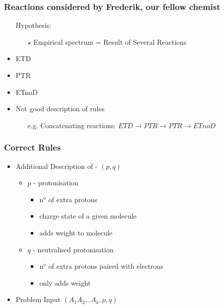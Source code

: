 \documentclass[xetex]{beamer}
\begin{document}
	\begin{frame}\frametitle{Reactions considered by Frederik, our fellow chemist}
		\begin{itemize}
			\item[] Hypothesis:
			\begin{itemize}
				\item[$\star$] Empirical spectrum = Result of Several Reactions
			\end{itemize}
			\item ETD
			\begin{center}
			\end{center}
			\item PTR
			\begin{center}
			\end{center}			
			\item ETnoD
			\begin{center}
			\end{center}			
			\item Not good description of rules
			\begin{itemize}
			 	\item[e.g.] Concatenating reactions: $ETD \rightarrow PTR \rightarrow PTR \rightarrow ETnoD$  
			\end{itemize} 			
		\end{itemize}
	\end{frame}

	\begin{frame}\frametitle{Correct Rules}
		
		\begin{itemize}
			\item Additional Description of \molecule - $(p,q)$
			\begin{itemize}
				\item $p$ - protonisation 
				\begin{itemize}
					\item n$^\text{o}$ of extra protons
					\item charge state of a given molecule
					\item adds weight to molecule
				\end{itemize}
				\item $q$ - neutralised protonisation
				\begin{itemize}
					\item n$^\text{o}$ of extra protons paired with electrons
					\item only adds weight
				\end{itemize}				
			\end{itemize}
			\item Problem Input $(A_1 A_2 \dots A_k, p , q)$ 
		\end{itemize}
	\end{frame}
\end{document}

